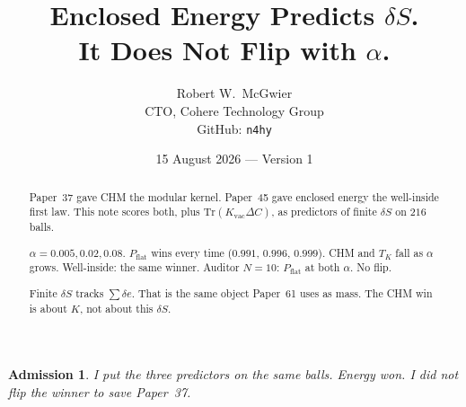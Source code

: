 \documentclass[11pt]{article}
\title{\textbf{Enclosed Energy Predicts $\delta S$.\\
It Does Not Flip with $\alpha$.}}
\author{Robert W.\ McGwier\\
\small CTO, Cohere Technology Group\\
\small GitHub: \texttt{n4hy}}
\date{15 August 2026 --- Version 1}
\newtheorem*{admission}{Admission}
\begin{document}
\maketitle

\begin{abstract}
\noindent
Paper~37 gave CHM the modular kernel. Paper~45 gave
enclosed energy the well-inside first law. This note
scores both, plus $\mathrm{Tr}(K_{\mathrm{vac}}\Delta C)$,
as predictors of finite $\delta S$ on $216$ balls.

$\alpha=0.005,0.02,0.08$. $P_{\mathrm{flat}}$ wins
every time ($0.991$, $0.996$, $0.999$). CHM and
$T_K$ fall as $\alpha$ grows. Well-inside: the same
winner. Auditor $N=10$: $P_{\mathrm{flat}}$ at both
$\alpha$. No flip.

Finite $\delta S$ tracks $\sum\delta e$. That is the
same object Paper~61 uses as mass. The CHM win is
about $K$, not about this $\delta S$.
\end{abstract}

\begin{admission}
I put the three predictors on the same balls. Energy
won. I did not flip the winner to save Paper~37.
\end{admission}
\end{document}
